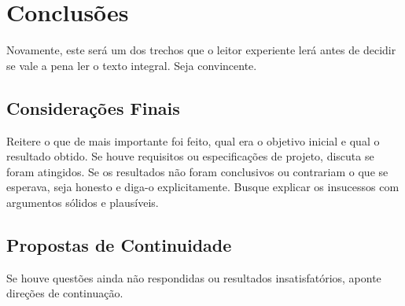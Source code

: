 \chapter{Conclusões}

Novamente, este será um dos trechos que o leitor experiente lerá antes de decidir se vale a pena ler o texto integral. Seja convincente.

\section{Considerações Finais}

Reitere o que de mais importante foi feito, qual era o objetivo inicial e qual o resultado obtido. Se houve requisitos ou especificações de projeto, discuta se foram atingidos. Se os resultados não foram conclusivos ou contrariam o que se esperava, seja honesto e diga-o explicitamente. Busque explicar os insucessos com argumentos sólidos e plausíveis. 

\section{Propostas de Continuidade}

Se houve questões ainda não respondidas ou resultados insatisfatórios, aponte direções de continuação.

\clearpage
